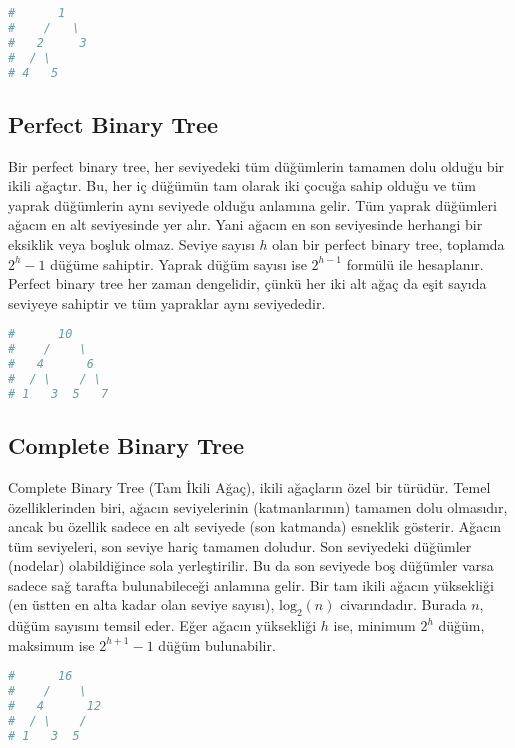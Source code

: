 \begin{lstlisting}[language=Python]
#      1
#    /   \
#   2     3
#  / \  
# 4   5 
\end{lstlisting}

\newpage

\subsection{Perfect Binary Tree}

Bir perfect binary tree, her seviyedeki tüm düğümlerin tamamen dolu olduğu bir ikili ağaçtır. Bu, her iç düğümün tam olarak iki çocuğa sahip olduğu ve tüm yaprak düğümlerin aynı seviyede olduğu anlamına gelir.  Tüm yaprak düğümleri ağacın en alt seviyesinde yer alır. Yani ağacın en son seviyesinde herhangi bir eksiklik veya boşluk olmaz. Seviye sayısı $h$ olan bir perfect binary tree, toplamda $2^h - 1$ düğüme sahiptir. Yaprak düğüm sayısı ise $2^{h-1}$ formülü ile hesaplanır. Perfect binary tree her zaman dengelidir, çünkü her iki alt ağaç da eşit sayıda seviyeye sahiptir ve tüm yapraklar aynı seviyededir.

\begin{lstlisting}[language=Python]
#      10
#    /    \
#   4      6
#  / \    / \
# 1   3  5   7
\end{lstlisting}

\newpage

\subsection{Complete Binary Tree}

Complete Binary Tree (Tam İkili Ağaç), ikili ağaçların özel bir türüdür. Temel özelliklerinden biri, ağacın seviyelerinin (katmanlarının) tamamen dolu olmasıdır, ancak bu özellik sadece en alt seviyede (son katmanda) esneklik gösterir. Ağacın tüm seviyeleri, son seviye hariç tamamen doludur.  Son seviyedeki düğümler (nodelar) olabildiğince sola yerleştirilir. Bu da son seviyede boş düğümler varsa sadece sağ tarafta bulunabileceği anlamına gelir. Bir tam ikili ağacın yüksekliği (en üstten en alta kadar olan seviye sayısı), $\text{log}_2(n)$ civarındadır. Burada $n$, düğüm sayısını temsil eder. Eğer ağacın yüksekliği $h$ ise, minimum $2^h$ düğüm, maksimum ise $2^{h+1} - 1$ düğüm bulunabilir.

\begin{lstlisting}[language=Python]
#      16
#    /    \
#   4      12
#  / \    /
# 1   3  5
\end{lstlisting}

